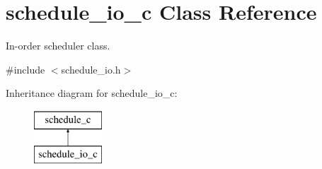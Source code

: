 \hypertarget{classschedule__io__c}{
\section{schedule\_\-io\_\-c Class Reference}
\label{classschedule__io__c}
}


In-\/order scheduler class.  




{\ttfamily \#include $<$schedule\_\-io.h$>$}

Inheritance diagram for schedule\_\-io\_\-c:\begin{figure}[H]
\begin{center}
\leavevmode
\includegraphics[height=2.000000cm]{classschedule__io__c}
\end{center}
\end{figure}
